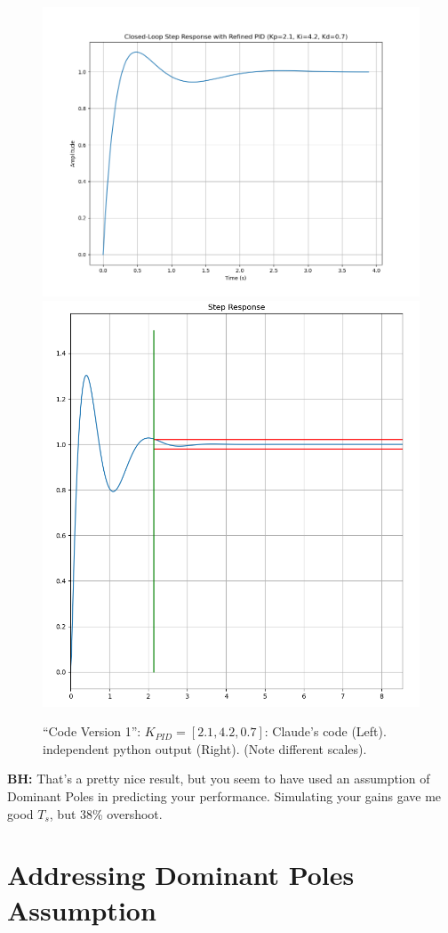 \documentclass{article}
\begin{document}
%
%


\begin{figure}\centering
\includegraphics[height=0.35\textwidth]{figsapdx/M47G16cl.png}
\includegraphics[height=0.35\textwidth]{figsapdx/M47G16.png}
\caption{``Code Version 1'': $K_{PID} = [2.1,4.2,0.7]$:  Claude's code (Left).  independent python output (Right).
(Note different scales). }
\end{figure}


\textbf{BH:} That's a pretty nice result, but you seem to have used an assumption of Dominant Poles in predicting your performance. Simulating your gains gave me good $T_s$, but 38\% overshoot.

\section*{Addressing Dominant Poles Assumption}
\end{document}
